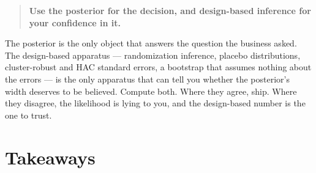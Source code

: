 \begin{quote}
\textbf{Use the posterior for the decision, and design-based inference for your confidence in it.}
\end{quote}

The posterior is the only object that answers the question the business asked. The design-based
apparatus --- randomization inference, placebo distributions, cluster-robust and HAC standard
errors, a bootstrap that assumes nothing about the errors --- is the only apparatus that can tell
you whether the posterior's width deserves to be believed. Compute both. Where they agree, ship.
Where they disagree, the likelihood is lying to you, and the design-based number is the one to
trust.

\section{Takeaways}
\label{sec:pvp:take}

